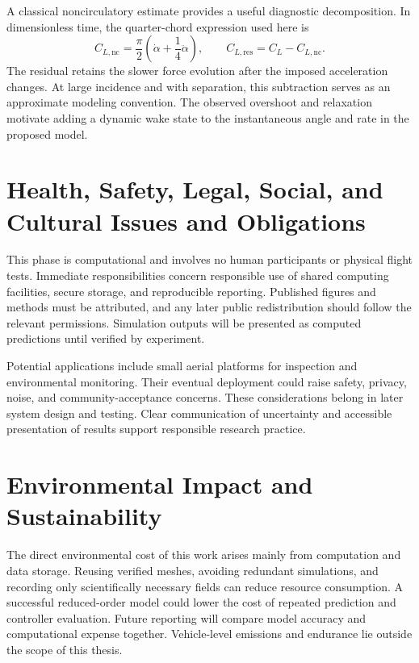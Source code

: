 A classical noncirculatory estimate provides a useful diagnostic decomposition. In dimensionless time, the quarter-chord expression used here is
\begin{equation}
C_{L,\mathrm{nc}}=\frac{\pi}{2}\left(\dot\alpha+\frac14\ddot\alpha\right),
\qquad C_{L,\mathrm{res}}=C_L-C_{L,\mathrm{nc}}.
\end{equation}
The residual retains the slower force evolution after the imposed acceleration changes. At large incidence and with separation, this subtraction serves as an approximate modeling convention. The observed overshoot and relaxation motivate adding a dynamic wake state to the instantaneous angle and rate in the proposed model.


\FloatBarrier
\section{Health, Safety, Legal, Social, and Cultural Issues and Obligations}
This phase is computational and involves no human participants or physical flight tests. Immediate responsibilities concern responsible use of shared computing facilities, secure storage, and reproducible reporting. Published figures and methods must be attributed, and any later public redistribution should follow the relevant permissions. Simulation outputs will be presented as computed predictions until verified by experiment.

Potential applications include small aerial platforms for inspection and environmental monitoring. Their eventual deployment could raise safety, privacy, noise, and community-acceptance concerns. These considerations belong in later system design and testing. Clear communication of uncertainty and accessible presentation of results support responsible research practice.

\section{Environmental Impact and Sustainability}
The direct environmental cost of this work arises mainly from computation and data storage. Reusing verified meshes, avoiding redundant simulations, and recording only scientifically necessary fields can reduce resource consumption. A successful reduced-order model could lower the cost of repeated prediction and controller evaluation. Future reporting will compare model accuracy and computational expense together. Vehicle-level emissions and endurance lie outside the scope of this thesis.

